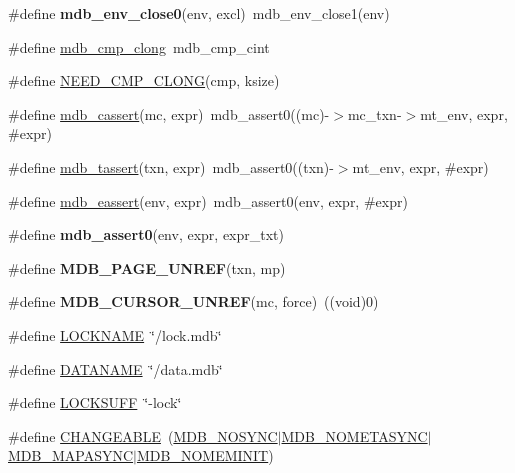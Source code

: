 \begin{DoxyCompactItemize}
\#define {\bfseries mdb\+\_\+env\+\_\+close0}(env,  excl)~mdb\+\_\+env\+\_\+close1(env)
\item 
\#define \mbox{\hyperlink{group__internal_ga47f9ed89920d053e13d17c1a443e9643}{mdb\+\_\+cmp\+\_\+clong}}~mdb\+\_\+cmp\+\_\+cint
\item 
\#define \mbox{\hyperlink{group__internal_ga970199debe102abdda37014b002e1318}{N\+E\+E\+D\+\_\+\+C\+M\+P\+\_\+\+C\+L\+O\+NG}}(cmp,  ksize)
\item 
\#define \mbox{\hyperlink{group__internal_ga2f8f04a538e4d5da1d21c02d3dba3f53}{mdb\+\_\+cassert}}(mc,  expr)~mdb\+\_\+assert0((mc)-\/$>$mc\+\_\+txn-\/$>$mt\+\_\+env, expr, \#expr)
\item 
\#define \mbox{\hyperlink{group__internal_ga819705fb9dafef807ab918e988f93717}{mdb\+\_\+tassert}}(txn,  expr)~mdb\+\_\+assert0((txn)-\/$>$mt\+\_\+env, expr, \#expr)
\item 
\#define \mbox{\hyperlink{group__internal_ga90d50765b3f12b8c239ab259f99ec243}{mdb\+\_\+eassert}}(env,  expr)~mdb\+\_\+assert0(env, expr, \#expr)
\item 
\#define {\bfseries mdb\+\_\+assert0}(env,  expr,  expr\+\_\+txt)
\item 
\mbox{\label{group__internal_ga123616cdfc7fddf1a6641cbf7ca881f3}} 
\#define {\bfseries M\+D\+B\+\_\+\+P\+A\+G\+E\+\_\+\+U\+N\+R\+EF}(txn,  mp)
\item 
\mbox{\label{group__internal_gae495e1f33442f2921ca31a0f6aa3196d}} 
\#define {\bfseries M\+D\+B\+\_\+\+C\+U\+R\+S\+O\+R\+\_\+\+U\+N\+R\+EF}(mc,  force)~((void)0)
\item 
\#define \mbox{\hyperlink{group__internal_ga869f3a387bf2529a5fdba260a82dc1d7}{L\+O\+C\+K\+N\+A\+ME}}~\char`\"{}/lock.\+mdb\char`\"{}
\item 
\#define \mbox{\hyperlink{group__internal_gad5a54432b85530e3f2cf9b88488e0eee}{D\+A\+T\+A\+N\+A\+ME}}~\char`\"{}/data.\+mdb\char`\"{}
\item 
\#define \mbox{\hyperlink{group__internal_ga3deadcb7227066bea0b6907e30a94a6b}{L\+O\+C\+K\+S\+U\+FF}}~\char`\"{}-\/lock\char`\"{}
\item 
\#define \mbox{\hyperlink{group__internal_ga73e66d763b8c4837cce5369052628bbe}{C\+H\+A\+N\+G\+E\+A\+B\+LE}}~(\mbox{\hyperlink{group__mdb__env_ga5791dd1adb09123f82dd1f331209e12e}{M\+D\+B\+\_\+\+N\+O\+S\+Y\+NC}}$\vert$\mbox{\hyperlink{group__mdb__env_ga5021c4e96ffe9f383f5b8ab2af8e4b16}{M\+D\+B\+\_\+\+N\+O\+M\+E\+T\+A\+S\+Y\+NC}}$\vert$\mbox{\hyperlink{group__mdb__env_gab034ed0d8e5938090aef5ee0997f7e94}{M\+D\+B\+\_\+\+M\+A\+P\+A\+S\+Y\+NC}}$\vert$\mbox{\hyperlink{group__mdb__env_gafa035a1f17ebf31376eafb7bd2cdd448}{M\+D\+B\+\_\+\+N\+O\+M\+E\+M\+I\+N\+IT}})

\end{DoxyCompactItemize}
